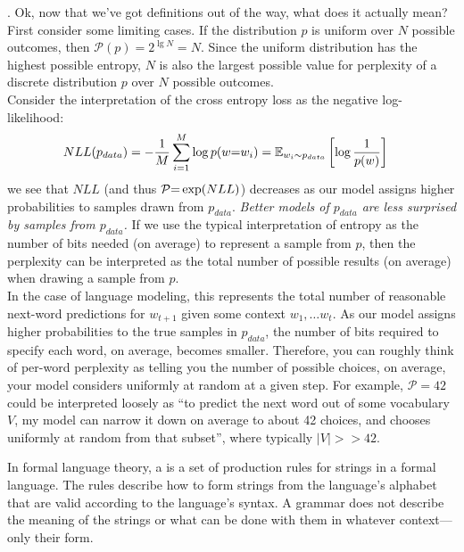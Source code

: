 \documentclass[11pt]{article}
\begin{document}
. Ok, now that we've got definitions out of the way, what does it actually mean? First consider some limiting cases. If the distribution $p$ is uniform over $N$ possible outcomes, then $\mathcal P(p) = 2^{\lg N} = N$. Since the uniform distribution has the highest possible entropy, $N$ is also the largest possible value for perplexity of a discrete distribution $p$ over $N$ possible outcomes. \\

Consider the interpretation of the cross entropy loss as the negative log-likelihood:
\begin{align}
	NLL(p_{data}) &= -\inv{M} \sum_{i=1}^{M} \log p(w \eq w_i) = \E[w_i \sim p_{data}]{\log \inv{p(w)}}
\end{align}
we see that $NLL$ (and thus $\mathcal P \eq \exp(NLL)$) decreases as our model assigns higher probabilities to samples drawn from $p_{data}$. \textit{Better models of $p_{data}$ are less surprised by samples from $p_{data}$.} If we use the typical interpretation of entropy as the number of bits needed (on average) to represent a sample from $p$, then the perplexity can be interpreted as the total number of possible results (on average) when drawing a sample from $p$. \\

In the case of language modeling, this represents the total number of reasonable next-word predictions for $w_{t+1}$ given some context $w_1, \ldots w_t$. As our model assigns higher probabilities to the true samples in $p_{data}$, the number of bits required to specify each word, on average, becomes smaller. Therefore, you can roughly think of per-word perplexity as telling you the number of possible choices, on average, your model considers uniformly at random at a given step. For example, $\mathcal P = 42$ could be interpreted loosely as ``to predict the next word out of some vocabulary $V$, my model can narrow it down on average to about 42 choices, and chooses uniformly at random from that subset'', where typically $|V| >> 42$. 



\myspace
{}
\myspace





\myspace
{}
\myspace

In formal language theory, a  is a set of production rules for strings in a formal language. The rules describe how to form strings from the language's alphabet that are valid according to the language's syntax. A grammar does not describe the meaning of the strings or what can be done with them in whatever context—only their form.
\end{document}
